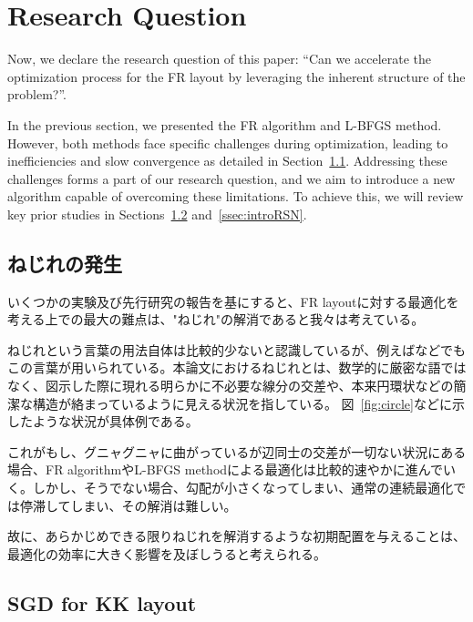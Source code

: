\documentclass[dvipdfmx,journal]{IEEEtran}
\begin{document}
\section{Research Question}\label{sec:RQ}

Now, we declare the research question of this paper: ``Can we accelerate the optimization process for the FR layout by leveraging the inherent structure of the problem?''.

In the previous section, we presented the FR algorithm and L-BFGS method.
However, both methods face specific challenges during optimization, leading to inefficiencies and slow convergence as detailed in Section~\ref{ssec:twist}.
Addressing these challenges forms a part of our research question, and we aim to introduce a new algorithm capable of overcoming these limitations. To achieve this, we will review key prior studies in Sections~\ref{ssec:sgd} and~\ref{ssec:introRSN}.

\subsection{ねじれの発生}\label{ssec:twist}

いくつかの実験及び先行研究の報告を基にすると、FR layoutに対する最適化を考える上での最大の難点は、"ねじれ"の解消であると我々は考えている。

ねじれという言葉の用法自体は比較的少ないと認識しているが、例えば\cite{cheongSnapshotVisualizationComplex2018}などでもこの言葉が用いられている。本論文におけるねじれとは、数学的に厳密な語ではなく、図示した際に現れる明らかに不必要な線分の交差や、本来円環状などの簡潔な構造が絡まっているように見える状況を指している。
図~\ref{fig:circle}などに示したような状況が具体例である。

これがもし、グニャグニャに曲がっているが辺同士の交差が一切ない状況にある場合、FR algorithmやL-BFGS methodによる最適化は比較的速やかに進んでいく。しかし、そうでない場合、勾配が小さくなってしまい、通常の連続最適化では停滞してしまい、その解消は難しい。

故に、あらかじめできる限りねじれを解消するような初期配置を与えることは、最適化の効率に大きく影響を及ぼしうると考えられる。

\subsection{SGD for KK layout}\label{ssec:sgd}
\end{document}
